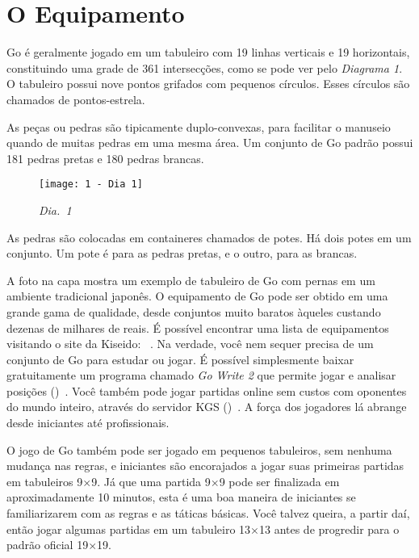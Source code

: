 \chapter{O Equipamento}

Go é geralmente jogado em um tabuleiro com 19 linhas verticais e 19 horizontais, constituindo uma grade de 361 intersecções, como se pode ver pelo \emph{Diagrama 1}. O tabuleiro possui nove pontos grifados com pequenos círculos. Esses círculos são chamados de pontos-estrela.

As peças ou pedras são tipicamente duplo-convexas, para facilitar o manuseio quando de muitas pedras em uma mesma área. Um conjunto de Go padrão possui 181 pedras pretas e 180 pedras brancas.

\begin{wrapfigure}{r}{60mm}
    \vspace{-20pt}
    \begin{center}
        \texttt{[image: 1 - Dia 1]}
        \captionsetup{justification=centering}
        \caption*{\emph{Dia.\@~1}}
    \end{center}
    \vspace{-21pt}
\end{wrapfigure}

As pedras são colocadas em containeres chamados de potes. Há dois potes em um conjunto. Um pote é para as pedras pretas, e o outro, para as brancas.

A foto na capa mostra um exemplo de tabuleiro de Go com pernas em um ambiente tradicional japonês. O equipamento de Go pode ser obtido em uma grande gama de qualidade, desde conjuntos muito baratos àqueles custando dezenas de milhares de reais. É possível encontrar uma lista de equipamentos visitando o site da Kiseido: \href{https://www.kiseido.com}{}~\cite{kiseido}. Na verdade, você nem sequer precisa de um conjunto de Go para estudar ou jogar. É possível simplesmente baixar gratuitamente um programa chamado \emph{Go Write 2} que permite jogar e analisar posições (\href{https://www.gowrite.net/GOWrite2_download.html}{})~\cite{gowrite}. Você também pode jogar partidas online sem custos com oponentes do mundo inteiro, através do servidor KGS (\href{https://www.gokgs.com}{})~\cite{kgs}. A força dos jogadores lá abrange desde iniciantes até profissionais.

O jogo de Go também pode ser jogado em pequenos tabuleiros, sem nenhuma mudança nas regras, e iniciantes são encorajados a jogar suas primeiras partidas em tabuleiros 9\(\times\)9. Já que uma partida 9\(\times\)9 pode ser finalizada em aproximadamente 10 minutos, esta é uma boa maneira de iniciantes se familiarizarem com as regras e as táticas básicas. Você talvez queira, a partir daí, então jogar algumas partidas em um tabuleiro 13$\times$13 antes de progredir para o padrão oficial 19$\times$19.